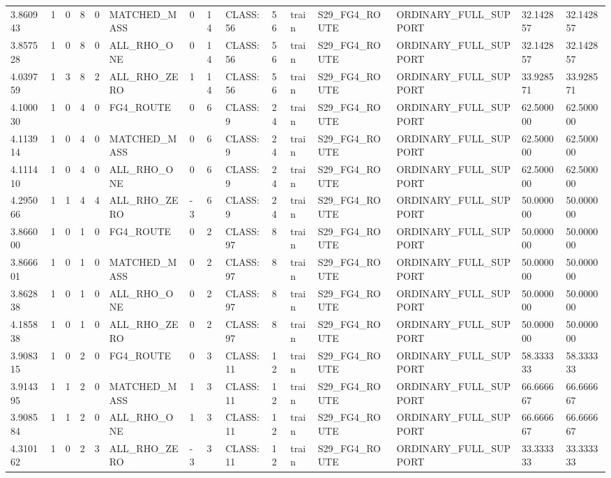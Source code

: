 \begin{tabular}{lllllllllllllll}
3.860943 & 1 & 0 & 8 & 0 & MATCHED\_MASS & 0 & 14 & CLASS:56 & 56 & train & S29\_FG4\_ROUTE & ORDINARY\_FULL\_SUPPORT & 32.142857 & 32.142857 \\
3.857528 & 1 & 0 & 8 & 0 & ALL\_RHO\_ONE & 0 & 14 & CLASS:56 & 56 & train & S29\_FG4\_ROUTE & ORDINARY\_FULL\_SUPPORT & 32.142857 & 32.142857 \\
4.039759 & 1 & 3 & 8 & 2 & ALL\_RHO\_ZERO & 1 & 14 & CLASS:56 & 56 & train & S29\_FG4\_ROUTE & ORDINARY\_FULL\_SUPPORT & 33.928571 & 33.928571 \\
4.100030 & 1 & 0 & 4 & 0 & FG4\_ROUTE & 0 & 6 & CLASS:9 & 24 & train & S29\_FG4\_ROUTE & ORDINARY\_FULL\_SUPPORT & 62.500000 & 62.500000 \\
4.113914 & 1 & 0 & 4 & 0 & MATCHED\_MASS & 0 & 6 & CLASS:9 & 24 & train & S29\_FG4\_ROUTE & ORDINARY\_FULL\_SUPPORT & 62.500000 & 62.500000 \\
4.111410 & 1 & 0 & 4 & 0 & ALL\_RHO\_ONE & 0 & 6 & CLASS:9 & 24 & train & S29\_FG4\_ROUTE & ORDINARY\_FULL\_SUPPORT & 62.500000 & 62.500000 \\
4.295066 & 1 & 1 & 4 & 4 & ALL\_RHO\_ZERO & -3 & 6 & CLASS:9 & 24 & train & S29\_FG4\_ROUTE & ORDINARY\_FULL\_SUPPORT & 50.000000 & 50.000000 \\
3.866000 & 1 & 0 & 1 & 0 & FG4\_ROUTE & 0 & 2 & CLASS:97 & 8 & train & S29\_FG4\_ROUTE & ORDINARY\_FULL\_SUPPORT & 50.000000 & 50.000000 \\
3.866601 & 1 & 0 & 1 & 0 & MATCHED\_MASS & 0 & 2 & CLASS:97 & 8 & train & S29\_FG4\_ROUTE & ORDINARY\_FULL\_SUPPORT & 50.000000 & 50.000000 \\
3.862838 & 1 & 0 & 1 & 0 & ALL\_RHO\_ONE & 0 & 2 & CLASS:97 & 8 & train & S29\_FG4\_ROUTE & ORDINARY\_FULL\_SUPPORT & 50.000000 & 50.000000 \\
4.185838 & 1 & 0 & 1 & 0 & ALL\_RHO\_ZERO & 0 & 2 & CLASS:97 & 8 & train & S29\_FG4\_ROUTE & ORDINARY\_FULL\_SUPPORT & 50.000000 & 50.000000 \\
3.908315 & 1 & 0 & 2 & 0 & FG4\_ROUTE & 0 & 3 & CLASS:11 & 12 & train & S29\_FG4\_ROUTE & ORDINARY\_FULL\_SUPPORT & 58.333333 & 58.333333 \\
3.914395 & 1 & 1 & 2 & 0 & MATCHED\_MASS & 1 & 3 & CLASS:11 & 12 & train & S29\_FG4\_ROUTE & ORDINARY\_FULL\_SUPPORT & 66.666667 & 66.666667 \\
3.908584 & 1 & 1 & 2 & 0 & ALL\_RHO\_ONE & 1 & 3 & CLASS:11 & 12 & train & S29\_FG4\_ROUTE & ORDINARY\_FULL\_SUPPORT & 66.666667 & 66.666667 \\
4.310162 & 1 & 0 & 2 & 3 & ALL\_RHO\_ZERO & -3 & 3 & CLASS:11 & 12 & train & S29\_FG4\_ROUTE & ORDINARY\_FULL\_SUPPORT & 33.333333 & 33.333333 \\

\end{tabular}
